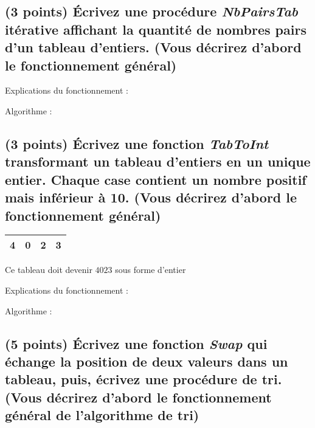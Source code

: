 \documentclass[11pt,a4paper]{article}
\begin{document}
\clearpage


\subsection{(3 points) \'Ecrivez une procédure \og \textit{NbPairsTab} \fg{} itérative affichant la quantité de nombres pairs d'un tableau d'entiers. (Vous décrirez d'abord le fonctionnement général) }


\begin{center}
Explications du fonctionnement :

Algorithme :
\end{center}




\subsection{(3 points) \'Ecrivez une fonction \og \textit{TabToInt} \fg{} transformant un tableau d'entiers en un unique entier. Chaque case contient un nombre positif mais inférieur à 10. (Vous décrirez d'abord le fonctionnement général) }


\begin{center}
  \begin{tabular}{| c | c | c | c |}
    \hline
    4 & 0 & 2 & 3 \\
    \hline
  \end{tabular}

  \smallskip

  Ce tableau doit devenir $ 4023 $ sous forme d'entier
\end{center}


\begin{center}
Explications du fonctionnement :

Algorithme :
\end{center}


\subsection{(5 points) \'Ecrivez une fonction \og \textit{Swap} \fg{} qui échange la position de deux valeurs dans un tableau, puis, écrivez une procédure de tri. (Vous décrirez d'abord le fonctionnement général de l'algorithme de tri) }
\end{document}
